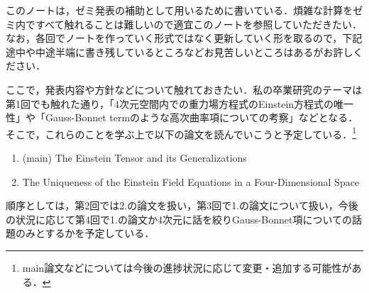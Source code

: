 \documentclass[main]{subfiles}
\begin{document}
このノートは，ゼミ発表の補助として用いるために書いている．煩雑な計算をゼミ内ですべて触れることは難しいので適宜このノートを参照していただきたい．なお，各回でノートを作っていく形式ではなく更新していく形を取るので，下記途中や中途半端に書き残しているところなどお見苦しいところはあるがお許しください．

ここで，発表内容や方針などについて触れておきたい．私の卒業研究のテーマは第1回でも触れた通り，「4次元空間内での重力場方程式のEinstein方程式の唯一性」や「Gauss-Bonnet termのような高次曲率項についての考察」などとなる．そこで，これらのことを学ぶ上で以下の論文を読んでいこうと予定している．\footnote{main論文などについては今後の進捗状況に応じて変更・追加する可能性がある．}
\begin{enumerate}
  \item (main) The Einstein Tensor and its Generalizations
  \item The Uniqueness of the Einstein Field Equations in a Four-Dimensional Space
\end{enumerate}

順序としては，第2回では2.の論文を扱い，第3回で1.の論文について扱い，今後の状況に応じて第4回で1.の論文か4次元に話を絞りGauss-Bonnet項についての話題のみとするかを予定している．
\end{document}
